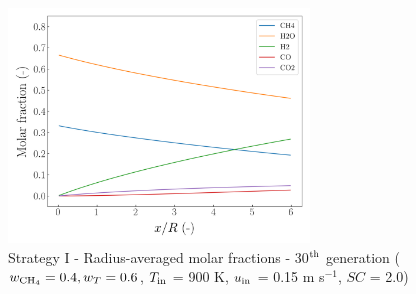 \documentclass[preprint,12pt]{elsarticle}
\begin{document}
%

\begin{figure}[h!]
\centering
\includegraphics[width=80mm]{results/5/40C_60T/GEN30-AVG.png}
\caption{\label{fig:5R4060G30-avg} Strategy I - Radius-averaged molar fractions -  30$^{\rm{th}}$ generation ($w_{\rm{CH_4}} = 0.4, w_T = 0.6$, $T_{\rm{in}}$ = 900 K, $u_{\rm{in}}$ = 0.15 m s$^{-1}$, $SC$ = 2.0)}
\end{figure}
\end{document}
